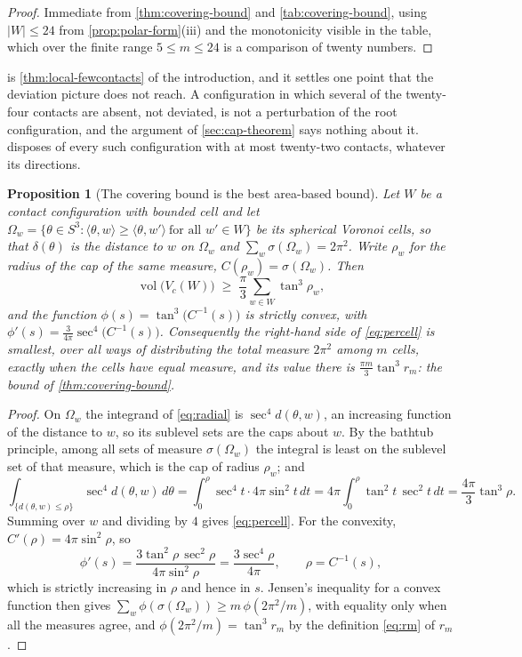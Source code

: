 \documentclass[11pt,reqno]{amsart}
\renewcommand{\_}{\origunderscore\allowbreak}
\numberwithin{equation}{section}
\theoremstyle{plain}
\newtheorem{prop}[thm]{Proposition}
\theoremstyle{definition}
\theoremstyle{remark}
\DeclareMathOperator{\vol}{vol}
\begin{document}
\begin{proof}
Immediate from \cref{thm:covering-bound} and
\cref{tab:covering-bound}, using $|W|\le24$ from
\cref{prop:polar-form}(iii) and the monotonicity visible in the table,
which over the finite range $5\le m\le24$ is a comparison of twenty
numbers.
\end{proof}

 is \cref{thm:local-fewcontacts} of the introduction, and
it settles one point that the deviation picture does not reach. A
configuration in which several of the twenty-four contacts are absent, not deviated, is not a perturbation of the root
configuration, and the argument of \cref{sec:cap-theorem} says
nothing about it.  disposes of every such configuration
with at most twenty-two contacts, whatever its directions.

\begin{prop}[The covering bound is the best area-based bound]\label{prop:area-optimal}
Let $W$ be a contact configuration with bounded cell and let
$\Omega_w=\{\theta\in S^3:\langle\theta,w\rangle\ge\langle\theta,w'\rangle
\ \text{for all }w'\in W\}$ be its spherical Voronoi cells, so that
$\delta(\theta)$ is the distance to $w$ on $\Omega_w$ and
$\sum_w\sigma(\Omega_w)=2\pi^2$. Write $\rho_w$ for the radius of the
cap of the same measure, $C(\rho_w)=\sigma(\Omega_w)$. Then
\begin{equation}\label{eq:percell}
  \vol\bigl(V_c(W)\bigr)\;\ge\;\frac{\pi}{3}\sum_{w\in W}\tan^3\rho_w ,
\end{equation}
and the function $\phi(s)=\tan^3\bigl(C^{-1}(s)\bigr)$ is strictly
convex, with $\phi'(s)=\tfrac{3}{4\pi}\sec^4\bigl(C^{-1}(s)\bigr)$.
Consequently the right-hand side of \eqref{eq:percell} is smallest, over
all ways of distributing the total measure $2\pi^2$ among $m$ cells,
exactly when the cells have equal measure, and its value there is
$\tfrac{\pi m}{3}\tan^3r_m$: the bound of \cref{thm:covering-bound}.
\end{prop}

\begin{proof}
On $\Omega_w$ the integrand of \eqref{eq:radial} is
$\sec^4 d(\theta,w)$, an increasing function of the distance to $w$, so
its sublevel sets are the caps about $w$. By the bathtub principle, among
all sets of measure $\sigma(\Omega_w)$ the integral is least on the
sublevel set of that measure, which is the cap of radius $\rho_w$; and
\[
  \int_{\{d(\theta,w)\le\rho\}}\sec^4d(\theta,w)\,d\theta
  =\int_0^{\rho}\sec^4t\cdot4\pi\sin^2t\,dt
  =4\pi\int_0^{\rho}\tan^2t\,\sec^2t\,dt
  =\frac{4\pi}{3}\tan^3\rho .
\]
Summing over $w$ and dividing by $4$ gives \eqref{eq:percell}. For the
convexity, $C'(\rho)=4\pi\sin^2\rho$, so
\[
  \phi'(s)=\frac{3\tan^2\rho\,\sec^2\rho}{4\pi\sin^2\rho}
  =\frac{3\sec^4\rho}{4\pi},\qquad \rho=C^{-1}(s),
\]
which is strictly increasing in $\rho$ and hence in $s$. Jensen's
inequality for a convex function then gives
$\sum_w\phi(\sigma(\Omega_w))\ge m\,\phi(2\pi^2/m)$, with equality only
when all the measures agree, and $\phi(2\pi^2/m)=\tan^3r_m$ by the
definition \eqref{eq:rm} of $r_m$.
\end{proof}
\end{document}

